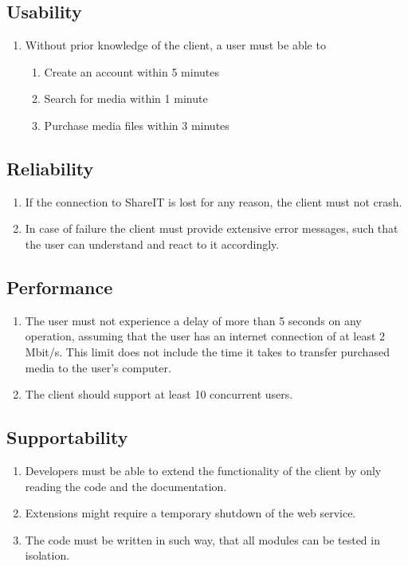 \documentclass[../report.tex]{subfiles}
\begin{document}
\subsection{Usability}

\begin{enumerate}[label=U\arabic*:]
\item Without prior knowledge of the client, a user must be able to
	\begin{enumerate}
	\item{Create an account within 5 minutes}
	\item Search for media within 1 minute
	\item Purchase media files within 3 minutes
	\end{enumerate}
\end{enumerate}

\subsection{Reliability}

\begin{enumerate}[label=R\arabic*:]
\item If the connection to ShareIT is lost for any reason, the client must not crash. 
\item In case of failure the client must provide extensive error messages, such that the user can understand and react to it accordingly.
\end{enumerate}

\subsection{Performance}

\begin{enumerate}[label=P\arabic*:]
\item The user must not experience a delay of more than 5 seconds on any operation, assuming that the user has an internet connection of at least 2 Mbit/s. This limit does not include the time it takes to transfer purchased media to the user's computer.
\item The client should support at least 10 concurrent users. 
\end{enumerate}

\subsection{Supportability}

\begin{enumerate}[label=S\arabic*:]
\item Developers must be able to extend the functionality of the client by only reading the code and the documentation.
\item Extensions might require a temporary shutdown of the web service.
\item The code must be written in such way, that all modules can be tested in isolation.
\end{enumerate}
\end{document}
